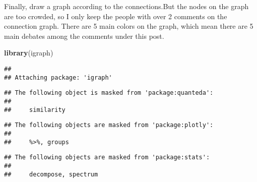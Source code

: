 \documentclass[]{article}
\newenvironment{Shaded}{\begin{snugshade}}{\end{snugshade}}
\newcommand{\KeywordTok}[1]{\textcolor[rgb]{0.13,0.29,0.53}{\textbf{{#1}}}}
\newcommand{\StringTok}[1]{\textcolor[rgb]{0.31,0.60,0.02}{{#1}}}
\newcommand{\NormalTok}[1]{{#1}}
\begin{document}
\begin{Shaded}
\end{Shaded}

Finally, draw a graph according to the connections.But the nodes on the
graph are too crowded, so I only keep the people with over 2 comments on
the connection graph. There are 5 main colors on the graph, which mean
there are 5 main debates among the comments under this post.

\begin{Shaded}
\begin{Highlighting}[]
\KeywordTok{library}\NormalTok{(igraph)}
\end{Highlighting}
\end{Shaded}

\begin{verbatim}
## 
## Attaching package: 'igraph'
\end{verbatim}

\begin{verbatim}
## The following object is masked from 'package:quanteda':
## 
##     similarity
\end{verbatim}

\begin{verbatim}
## The following objects are masked from 'package:plotly':
## 
##     %>%, groups
\end{verbatim}

\begin{verbatim}
## The following objects are masked from 'package:stats':
## 
##     decompose, spectrum
\end{verbatim}
\end{document}
